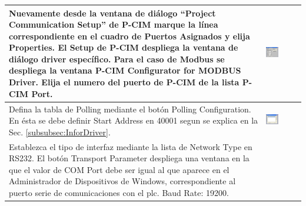 \begin{table}[H]
\centering
\renewcommand*{\arraystretch}{0.01}
\begin{tabular}{*{2}{m{}}}
\hline
  Nuevamente desde la ventana de diálogo ``Project Communication Setup'' de
  P-CIM marque la línea correspondiente en el cuadro de Puertos Asignados y 
  elija  Properties. El Setup de P-CIM despliega la ventana de diálogo driver 
  específico. Para el caso de Modbus se despliega la ventana P-CIM Configurator 
  for MODBUS Driver. Elija el numero del puerto de P-CIM de la lista P-CIM Port.
  &\begin{center}
    \includegraphics[width=0.4\textwidth]
      {Cap5-SCADA/images/modbusDriver.jpeg}
  \end{center}\\
\hline
  Defina la tabla de Polling mediante el botón Polling Configuration. En ésta
  se debe definir Start Address en 40001 segun se explica en la 
  Sec. \ref{subsubsec:InforDriver}.
  &\begin{center}
        \includegraphics[width=0.4\textwidth]
      {Cap5-SCADA/images/modbusDriver1.jpeg}
  \end{center}\\
\hline 
   Establezca el tipo de interfaz mediante la lista de Network Type en RS232. 
   El botón Transport Parameter despliega una ventana en la que el valor de COM 
   Port debe ser igual al que aparece en el Administrador de 
   Dispositivos de Windows, correspondiente al puerto serie de
   comunicaciones con el \gls{plc}. Baud Rate: 19200.

\end{tabular}
\end{table}
